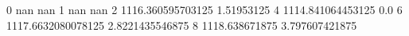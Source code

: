 0 nan nan
1 nan nan
2 1116.360595703125 1.51953125
4 1114.841064453125 0.0
6 1117.6632080078125 2.8221435546875
8 1118.638671875 3.797607421875
